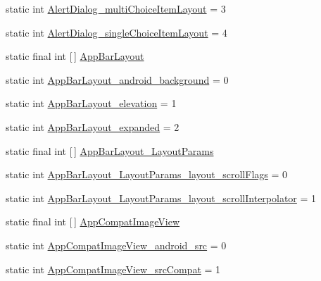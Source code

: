 \begin{DoxyCompactItemize}
\item 
static int \hyperlink{classandroid_1_1support_1_1v7_1_1cardview_1_1R_1_1styleable_a2921500337329d9f9f4df0f85b020689}{Alert\+Dialog\+\_\+multi\+Choice\+Item\+Layout} = 3
\item 
static int \hyperlink{classandroid_1_1support_1_1v7_1_1cardview_1_1R_1_1styleable_a0203543b0366663e4ea18dd225ce00cb}{Alert\+Dialog\+\_\+single\+Choice\+Item\+Layout} = 4
\item 
static final int \mbox{[}$\,$\mbox{]} \hyperlink{classandroid_1_1support_1_1v7_1_1cardview_1_1R_1_1styleable_ab9fe56d8bb5990d833de044115d0edbe}{App\+Bar\+Layout}
\item 
static int \hyperlink{classandroid_1_1support_1_1v7_1_1cardview_1_1R_1_1styleable_a4d45203e5c11f7828d22760555de2f5a}{App\+Bar\+Layout\+\_\+android\+\_\+background} = 0
\item 
static int \hyperlink{classandroid_1_1support_1_1v7_1_1cardview_1_1R_1_1styleable_a405d6ed7804434784f1f7baf4ccfe842}{App\+Bar\+Layout\+\_\+elevation} = 1
\item 
static int \hyperlink{classandroid_1_1support_1_1v7_1_1cardview_1_1R_1_1styleable_a25a66e2f26717d1b0034f4cad6a32780}{App\+Bar\+Layout\+\_\+expanded} = 2
\item 
static final int \mbox{[}$\,$\mbox{]} \hyperlink{classandroid_1_1support_1_1v7_1_1cardview_1_1R_1_1styleable_af9edb99ce8a17a0ba323d6a695308d5d}{App\+Bar\+Layout\+\_\+\+Layout\+Params}
\item 
static int \hyperlink{classandroid_1_1support_1_1v7_1_1cardview_1_1R_1_1styleable_a53dce7877a5f3d244d65077ff61872fc}{App\+Bar\+Layout\+\_\+\+Layout\+Params\+\_\+layout\+\_\+scroll\+Flags} = 0
\item 
static int \hyperlink{classandroid_1_1support_1_1v7_1_1cardview_1_1R_1_1styleable_a0de7675ce2c7d78872be858b9691bdb0}{App\+Bar\+Layout\+\_\+\+Layout\+Params\+\_\+layout\+\_\+scroll\+Interpolator} = 1
\item 
static final int \mbox{[}$\,$\mbox{]} \hyperlink{classandroid_1_1support_1_1v7_1_1cardview_1_1R_1_1styleable_ae53f264fbfeb101a6955fa11b459709d}{App\+Compat\+Image\+View}
\item 
static int \hyperlink{classandroid_1_1support_1_1v7_1_1cardview_1_1R_1_1styleable_abbe7d50baa1c39921fd4886634bc23a7}{App\+Compat\+Image\+View\+\_\+android\+\_\+src} = 0
\item 
static int \hyperlink{classandroid_1_1support_1_1v7_1_1cardview_1_1R_1_1styleable_a846bf5775d1a9c0dd8b2d322212fda3a}{App\+Compat\+Image\+View\+\_\+src\+Compat} = 1

\end{DoxyCompactItemize}

